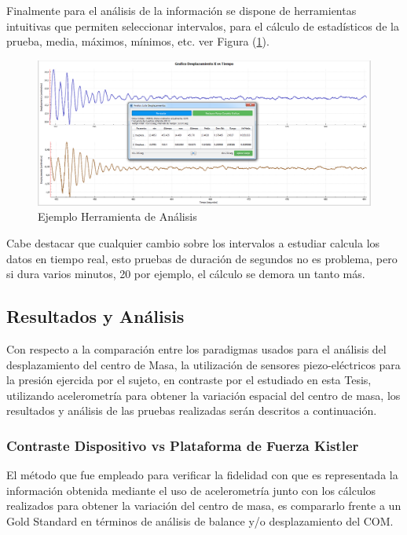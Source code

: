\documentclass[12pt,a4paper]{article}
\begin{document}
Finalmente para el análisis de la información se dispone de herramientas intuitivas que permiten seleccionar intervalos, para el cálculo de estadísticos de la prueba, media, máximos, mínimos, etc. ver Figura (\ref{fig:analsisGraficos}).

\begin{figure}[H]
	\centering
	\includegraphics[scale=0.3]{images/analisisGraficos}
	\caption{Ejemplo Herramienta de Análisis}
	\label{fig:analsisGraficos}
\end{figure}

Cabe destacar que cualquier cambio sobre los intervalos a estudiar calcula los datos en tiempo real, esto pruebas de duración de segundos no es problema, pero si dura varios minutos, 20 por ejemplo, el cálculo se demora un tanto más.

\newpage
\subsection{Resultados y Análisis}
Con respecto a la comparación entre los paradigmas usados para el análisis del desplazamiento del centro de Masa, la utilización de sensores piezo-eléctricos para la presión ejercida por el sujeto, en contraste por el estudiado en esta Tesis, utilizando acelerometría para obtener la variación espacial del centro de masa, los resultados y análisis de las pruebas realizadas serán descritos a continuación.

\subsubsection{Contraste Dispositivo vs Plataforma de Fuerza Kistler}

El método que fue empleado para verificar la fidelidad con que es representada la información obtenida mediante el uso de acelerometría junto con los cálculos realizados para obtener la variación del centro de masa, es compararlo frente a un Gold Standard en términos de análisis de balance y/o desplazamiento del COM.
\end{document}
